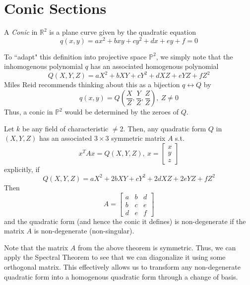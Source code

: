 \section{Conic Sections}

\begin{mydef}
A \emph{Conic} in $\mathbb{R}^2$ is a plane curve given by the quadratic
equation
\[
q(x,y) = ax^2 + bxy + cy^2 + dx + ey + f = 0
\]
\end{mydef}

To ``adapt" this definition into projective space $\mathbb{P}^2$, we simply
note that the inhomogenous polynomial $q$ has an associated
homogenous polynomial 
\[
Q(X,Y,Z) = aX^2 + bXY + cY^2 + dXZ + eYZ + fZ^2
\]
Miles Reid recommends thinking about this as a bijection $q \leftrightarrow Q$ by
\[
q(x,y) = Q(\frac{X}{Z},\frac{Y}{Z},\frac{Z}{Z}),~Z\ne 0
\]
Thus, a conic in $\mathbb{P}^2$ would be determined by the zeroes of $Q$.

\begin{theorem}
Let $k$ be any field of characteristic $\ne 2$. Then, any quadratic form $Q$
in $(X,Y,Z)$ has an associated $3 \times 3$ symmetric matrix $A$ s.t.
\[
x^TAx =  Q(X,Y,Z),~x=\begin{bmatrix}
x\\
y\\
z
\end{bmatrix}
\]
explicitly, if 
\[
Q(X,Y,Z) = aX^2 + 2bXY + cY^2 + 2dXZ + 2eYZ + fZ^2
\]
Then
\[
A = \begin{bmatrix}
a & b & d\\
b & c & e\\
d & e & f
\end{bmatrix}
\]
and the quadratic form (and hence the conic it defines) is non-degenerate
if the matrix $A$ is non-degenerate (non-singular).
\end{theorem}

Note that the matrix $A$ from the above theorem is symmetric. Thus, we can
apply the Spectral Theorem to see that we can diagonalize it using some
orthogonal matrix. This effectively allows us to transform any non-degenerate 
quadratic form into a homogenous quadratic form through a change of basis.

